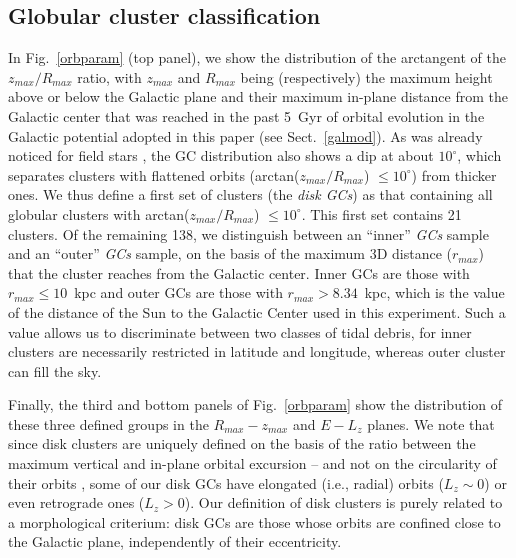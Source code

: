         \onecolumn
        \normalsize
    \subsection{Globular cluster classification}\label{class}
        In Fig.~\ref{orbparam} (top panel), we show the distribution of the arctangent of the $z_{max}/R_{max}$ ratio, with $z_{max}$ and $R_{max}$ being (respectively) the maximum height above or below the Galactic plane and their maximum in-plane distance from the Galactic center that was reached in the past 5~Gyr of orbital evolution in the Galactic potential adopted in this paper (see Sect.~\ref{galmod}). As was already noticed for field stars \citep[see][]{2018ApJ...863..113H}, the GC distribution also shows a dip at about $10^\circ$, which separates clusters with flattened orbits (arctan($z_{max}/R_{max}$) $\le 10^\circ$) from thicker ones. We thus define a first set of clusters (the \emph{disk GCs}) as that containing all globular clusters with arctan($z_{max}/R_{max}$) $\le 10^\circ$. This first set contains 21 clusters. Of the remaining 138, we distinguish between  an ``inner'' \emph{ GCs} sample and an ``outer'' \emph{ GCs} sample, on the basis of the maximum 3D distance ($r_{max}$) that the cluster reaches from the Galactic center. Inner GCs are those with $r_{max} \le 10$~kpc and outer GCs are those with $r_{max} > 8.34$~kpc, which is the value of the distance of the Sun to the Galactic Center used in this experiment. Such a value allows us to discriminate between two classes of tidal debris, for inner clusters are necessarily restricted in latitude and longitude, whereas outer cluster can fill the sky. 

        Finally, the third and bottom panels of Fig.~\ref{orbparam}  show the distribution of these three defined groups in the $R_{max}-z_{max}$ and $E-L_z$ planes. We note that since disk clusters are uniquely defined on the basis of the ratio between the maximum vertical and in-plane orbital excursion -- and not on the circularity of their orbits \citep[as seen, e.g., in][]{2019A&A...630L...4M},  some of our disk GCs have elongated (i.e., radial) orbits ($L_z  \sim 0$) or even retrograde ones ($L_z > 0$). Our definition of disk clusters is purely related to a morphological criterium: disk GCs are those whose orbits are confined close to the Galactic plane, independently of their eccentricity.

